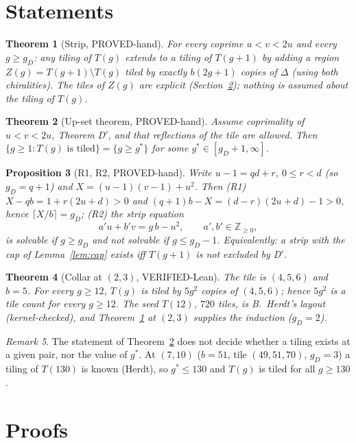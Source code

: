 \documentclass[11pt]{article}
\newtheorem{theorem}{Theorem}
\newtheorem{proposition}[theorem]{Proposition}
\theoremstyle{remark}
\newtheorem{remark}[theorem]{Remark}
\newcommand{\Z}{\mathbb{Z}}
\begin{document}
\section{Statements}\label{sec:statements}
\begin{theorem}[Strip, PROVED-hand]\label{thm:strip}
For every coprime $u<v<2u$ and every $g\ge g_D$: any tiling of $T(g)$ extends to a tiling of $T(g+1)$ by adding a region $Z(g)=T(g+1)\setminus T(g)$ tiled by exactly $b(2g+1)$ copies of $\Delta$ (using both chiralities). The tiles of $Z(g)$ are explicit (Section~\ref{sec:proofs}); nothing is assumed about the tiling of $T(g)$.
\end{theorem}
\begin{theorem}[Up-set theorem, PROVED-hand]\label{thm:upset}
Assume coprimality of $u<v<2u$, Theorem D$'$, and that reflections of the tile are allowed. Then $\{g\ge1: T(g)\text{ is tiled}\}=\{g\ge g^*\}$ for some $g^*\in[g_D+1,\infty]$.
\end{theorem}
\begin{proposition}[R1, R2, PROVED-hand]\label{prop:r}
Write $u-1=qd+r$, $0\le r<d$ (so $g_D=q+1$) and $X=(u-1)(v-1)+u^2$. Then
(R1) $X-qb=1+r(2u+d)>0$ and $(q+1)b-X=(d-r)(2u+d)-1>0$, hence $\lceil X/b\rceil=g_D$;
(R2) the strip equation
\begin{equation}\tag{SE}\label{eq:se}
a'u+b'v=g\,b-u^2,\qquad a',b'\in\Z_{\ge0},
\end{equation}
is solvable if $g\ge g_D$ and not solvable if $g\le g_D-1$. Equivalently: a strip with the cap of Lemma~\ref{lem:cap} exists iff $T(g+1)$ is not excluded by D$'$.
\end{proposition}
\begin{theorem}[Collar at $(2,3)$, VERIFIED-Lean]\label{thm:collar23}
The tile is $(4,5,6)$ and $b=5$. For every $g\ge12$, $T(g)$ is tiled by $5g^2$ copies of $(4,5,6)$; hence $5g^2$ is a tile count for every $g\ge12$. The seed $T(12)$, $720$ tiles, is B.~Herdt's layout (kernel-checked), and Theorem~\ref{thm:strip} at $(2,3)$ supplies the induction ($g_D=2$).
\end{theorem}
\begin{remark}
The statement of Theorem~\ref{thm:upset} does not decide whether a tiling exists at a given pair, nor the value of $g^*$. At $(7,10)$ ($b=51$, tile $(49,51,70)$, $g_D=3$) a tiling of $T(130)$ is known (Herdt), so $g^*\le130$ and $T(g)$ is tiled for all $g\ge130$.
\end{remark}

\section{Proofs}\label{sec:proofs}
\end{document}
